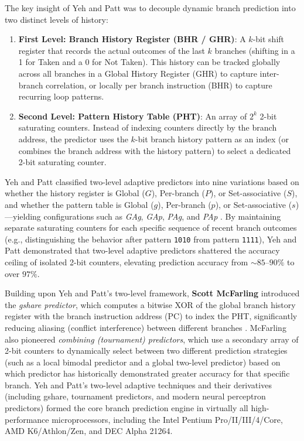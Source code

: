 The key insight of Yeh and Patt was to decouple dynamic branch prediction into two distinct levels of history:
\begin{enumerate}
    \item \textbf{First Level: Branch History Register (BHR / GHR)}: A $k$-bit shift register that records the actual outcomes of the last $k$ branches (shifting in a 1 for Taken and a 0 for Not Taken). This history can be tracked globally across all branches in a Global History Register (GHR) to capture inter-branch correlation, or locally per branch instruction (BHR) to capture recurring loop patterns.
    \item \textbf{Second Level: Pattern History Table (PHT)}: An array of $2^k$ 2-bit saturating counters. Instead of indexing counters directly by the branch address, the predictor uses the $k$-bit branch history pattern as an index (or combines the branch address with the history pattern) to select a dedicated 2-bit saturating counter.
\end{enumerate}

Yeh and Patt classified two-level adaptive predictors into nine variations based on whether the history register is Global ($G$), Per-branch ($P$), or Set-associative ($S$), and whether the pattern table is Global ($g$), Per-branch ($p$), or Set-associative ($s$)---yielding configurations such as \emph{GAg}, \emph{GAp}, \emph{PAg}, and \emph{PAp} \cite{yeh1992alternative}. By maintaining separate saturating counters for each specific sequence of recent branch outcomes (e.g., distinguishing the behavior after pattern \texttt{1010} from pattern \texttt{1111}), Yeh and Patt demonstrated that two-level adaptive predictors shattered the accuracy ceiling of isolated 2-bit counters, elevating prediction accuracy from $\sim 85\text{--}90\%$ to over $97\%$.

Building upon Yeh and Patt's two-level framework, \textbf{Scott McFarling} introduced the \textit{gshare predictor}, which computes a bitwise XOR of the global branch history register with the branch instruction address (PC) to index the PHT, significantly reducing aliasing (conflict interference) between different branches \cite{mcfarling1993combining}. McFarling also pioneered \textit{combining (tournament) predictors}, which use a secondary array of 2-bit counters to dynamically select between two different prediction strategies (such as a local bimodal predictor and a global two-level predictor) based on which predictor has historically demonstrated greater accuracy for that specific branch. Yeh and Patt's two-level adaptive techniques and their derivatives (including gshare, tournament predictors, and modern neural perceptron predictors) formed the core branch prediction engine in virtually all high-performance microprocessors, including the Intel Pentium Pro/II/III/4/Core, AMD K6/Athlon/Zen, and DEC Alpha 21264.


